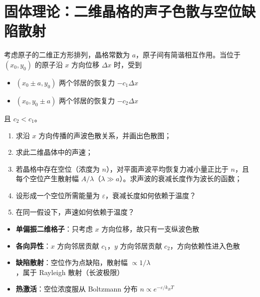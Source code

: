 \section{固体理论：二维晶格的声子色散与空位缺陷散射}
\label{sec:2d-vacancy-scattering}

\begin{modelbox}[题目：含空位缺陷的二维正方晶格声子]
考虑原子的二维正方形排列，晶格常数为 $a$，原子间有简谐相互作用。当位于 $(x_0,y_0)$ 的原子沿 $x$ 方向位移 $\Delta x$ 时，受到
\begin{itemize}[nosep]
    \item $(x_0\pm a,y_0)$ 两个邻居的恢复力 $-c_1\Delta x$
    \item $(x_0,y_0\pm a)$ 两个邻居的恢复力 $-c_2\Delta x$
\end{itemize}
且 $c_2<c_1$。
\begin{enumerate}
    \item 求沿 $x$ 方向传播的声波色散关系，并画出色散图；
    \item 求此二维晶体中的声速；
    \item 若晶格中存在空位（浓度为 $n$），对平面声波平均恢复力减小量正比于 $n$，且每个空位产生散射幅 $A/\lambda$（$\lambda\gg a$）。求声波的衰减长度作为波长的函数；
    \item 设形成一个空位所需能量为 $\varepsilon$，衰减长度如何依赖于温度？
    \item 在同一假设下，声速如何依赖于温度？
\end{enumerate}
\end{modelbox}

\begin{tipbox}[考点快速分析]
\begin{itemize}
    \item \textbf{单偏振二维格子}：只考虑 $x$ 方向位移，故只有一支纵波色散
    \item \textbf{各向异性}：$x$ 方向邻居贡献 $c_1$，$y$ 方向邻居贡献 $c_2$，方向依赖性进入色散
    \item \textbf{缺陷散射}：空位作为点缺陷，散射幅 $\propto 1/\lambda$，属于 Rayleigh 散射（长波极限）
    \item \textbf{热激活}：空位浓度服从 Boltzmann 分布 $n\propto e^{-\varepsilon/k_BT}$
\end{itemize}
\end{tipbox}

